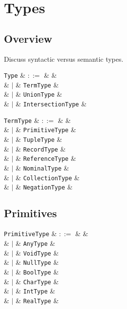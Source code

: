 \chapter{Types}
\section{Overview}
Discuss syntactic versus semantic types.

\begin{syntax}
  \verb+Type+ & $::=$ & &\\
  & $|$ & \verb+TermType+ &\\
  & $|$ & \verb+UnionType+ &\\
  & $|$ & \verb+IntersectionType+ &\\
\end{syntax}

\begin{syntax}
  \verb+TermType+ & $::=$ & &\\
  & $|$ & \verb+PrimitiveType+ &\\
  & $|$ & \verb+TupleType+ &\\
  & $|$ & \verb+RecordType+ &\\
  & $|$ & \verb+ReferenceType+ &\\
  & $|$ & \verb+NominalType+ &\\
  & $|$ & \verb+CollectionType+ &\\
  & $|$ & \verb+NegationType+ &\\
\end{syntax}


\section{Primitives}

\begin{syntax}
  \verb+PrimitiveType+ & $::=$ & &\\
  & $|$ & \verb+AnyType+ &\\
  & $|$ & \verb+VoidType+ &\\
  & $|$ & \verb+NullType+ &\\
  & $|$ & \verb+BoolType+ &\\
  & $|$ & \verb+CharType+ &\\
  & $|$ & \verb+IntType+ &\\
  & $|$ & \verb+RealType+ &\\
\end{syntax}



